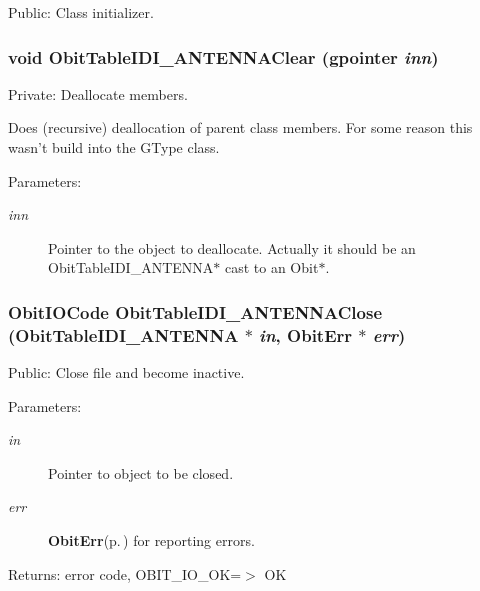 Public: Class initializer. 

\subsubsection{\setlength{\rightskip}{0pt plus 5cm}void Obit\-Table\-IDI\_\-ANTENNAClear (gpointer {\em inn})}\label{ObitTableIDI__ANTENNA_8c_a9}


Private: Deallocate members. 

Does (recursive) deallocation of parent class members. For some reason this wasn't build into the GType class. \begin{Desc}
\item[Parameters:]
\begin{description}
\item[{\em inn}]Pointer to the object to deallocate. Actually it should be an Obit\-Table\-IDI\_\-ANTENNA$\ast$ cast to an Obit$\ast$. \end{description}
\end{Desc}
\subsubsection{\setlength{\rightskip}{0pt plus 5cm}Obit\-IOCode Obit\-Table\-IDI\_\-ANTENNAClose ({\bf Obit\-Table\-IDI\_\-ANTENNA} $\ast$ {\em in}, {\bf Obit\-Err} $\ast$ {\em err})}\label{ObitTableIDI__ANTENNA_8c_a25}


Public: Close file and become inactive. 

\begin{Desc}
\item[Parameters:]
\begin{description}
\item[{\em in}]Pointer to object to be closed. \item[{\em err}]{\bf Obit\-Err}{\rm (p.\,\pageref{structObitErr})} for reporting errors. \end{description}
\end{Desc}
\begin{Desc}
\item[Returns:]error code, OBIT\_\-IO\_\-OK=$>$ OK \end{Desc}
